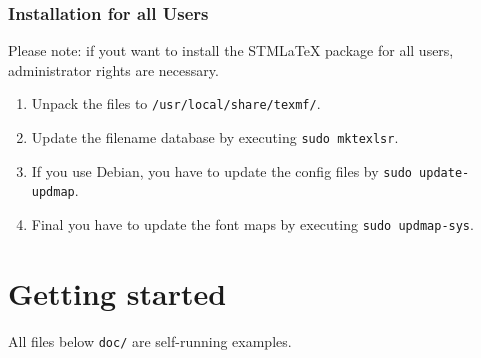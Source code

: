 \documentclass[%
  type=article,%
  layout=koma,%
  page=false,%
  hyperref=true,%
  cleveref=true,%
  conditionallox=true,%
  conditionalloxnewpage=true,%
  date=true,%
  glossaries=true,%
  index=true,%
  math=true,%
  listings=true%
]{stmtext}
\newcommand{\stmlatex}{STM\LaTeX\xspace}
\begin{document}
\subsubsection{Installation for all Users}
Please note: if yout want to install the \stmlatex package for all users, administrator rights are necessary.
\begin{enumerate}
  \item Unpack the files to \texttt{/usr/local/share/texmf/}.
  \item Update the filename database by executing \texttt{sudo mktexlsr}.
  \item If you use Debian, you have to update the config files by \texttt{sudo update-updmap}.
  \item Final you have to update the font maps by executing \texttt{sudo updmap-sys}.
\end{enumerate}

\section{Getting started}

All files below \texttt{doc/} are self-running examples.
\end{document}
